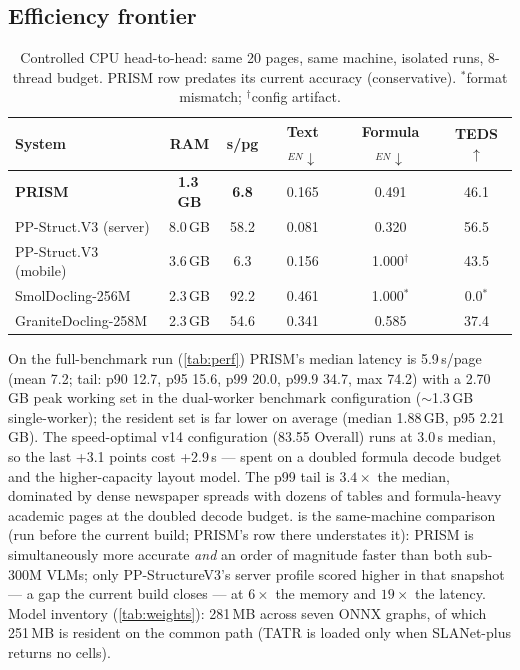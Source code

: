 \subsection{Efficiency frontier}
\label{sec:efficiency}

\begin{table}[t]
\centering
\caption{Controlled CPU head-to-head: same 20 pages, same machine, isolated runs, 8-thread budget. PRISM row predates its current accuracy (conservative). $^{*}$format mismatch; $^{\dagger}$config artifact.}
\label{tab:cpu_frontier}
\small
\setlength{\tabcolsep}{3pt}
\begin{tabular}{lccccc}
\toprule
System & RAM & s/pg & Text$_{EN}\downarrow$ & Formula$_{EN}\downarrow$ & TEDS$\uparrow$ \\
\midrule
\textbf{PRISM} & \textbf{1.3\,GB} & \textbf{6.8} & 0.165 & 0.491 & 46.1 \\
PP-Struct.V3 (server) & 8.0\,GB & 58.2 & 0.081 & 0.320 & 56.5 \\
PP-Struct.V3 (mobile) & 3.6\,GB & 6.3 & 0.156 & 1.000$^{\dagger}$ & 43.5 \\
SmolDocling-256M & 2.3\,GB & 92.2 & 0.461 & 1.000$^{*}$ & 0.0$^{*}$ \\
GraniteDocling-258M & 2.3\,GB & 54.6 & 0.341 & 0.585 & 37.4 \\
\bottomrule
\end{tabular}
\end{table}

On the full-benchmark run (\cref{tab:perf}) PRISM's median latency is 5.9\,s/page (mean 7.2; tail: p90 12.7, p95 15.6, p99 20.0, p99.9 34.7, max 74.2) with a 2.70\,GB peak working set in the dual-worker benchmark configuration ($\sim$1.3\,GB single-worker); the resident set is far lower on average (median 1.88\,GB, p95 2.21\,GB). The speed-optimal v14 configuration (83.55 Overall) runs at 3.0\,s median, so the last +3.1 points cost +2.9\,s --- spent on a doubled formula decode budget and the higher-capacity layout model. The p99 tail is $3.4\times$ the median, dominated by dense newspaper spreads with dozens of tables and formula-heavy academic pages at the doubled decode budget.  is the same-machine comparison (run before the current build; PRISM's row there understates it): PRISM is simultaneously more accurate \emph{and} an order of magnitude faster than both sub-300M VLMs; only PP-StructureV3's server profile scored higher in that snapshot --- a gap the current build closes --- at $6\times$ the memory and $19\times$ the latency. Model inventory (\cref{tab:weights}): 281\,MB across seven ONNX graphs, of which 251\,MB is resident on the common path (TATR is loaded only when SLANet-plus returns no cells).

